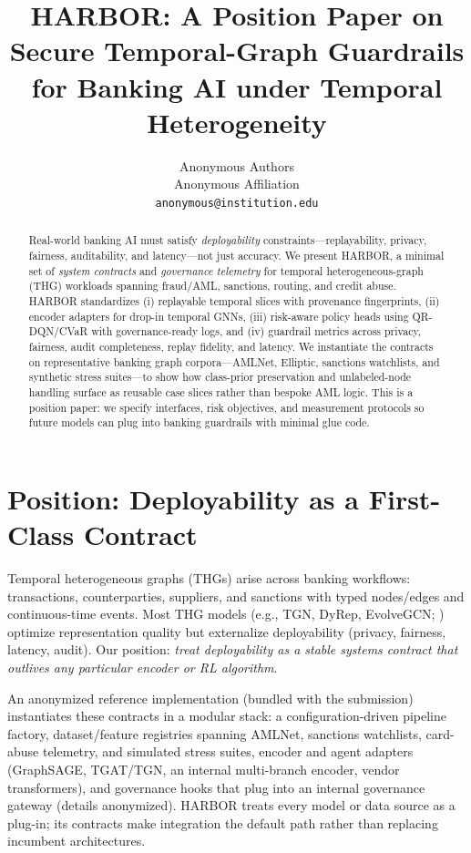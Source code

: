 \documentclass[letterpaper]{article}
\title{HARBOR: A Position Paper on Secure Temporal-Graph Guardrails\\for Banking AI under Temporal Heterogeneity}
\author{
Anonymous Authors\\
Anonymous Affiliation\\
\texttt{anonymous@institution.edu}
}
\begin{document}
\maketitle

\begin{abstract}
Real-world banking AI must satisfy \emph{deployability} constraints---replayability, privacy, fairness, auditability, and latency---not just accuracy. We present \textsc{HARBOR}, a minimal set of \emph{system contracts} and \emph{governance telemetry} for temporal heterogeneous-graph (THG) workloads spanning fraud/AML, sanctions, routing, and credit abuse. \textsc{HARBOR} standardizes (i) replayable temporal slices with provenance fingerprints, (ii) encoder adapters for drop-in temporal GNNs, (iii) risk-aware policy heads using QR-DQN/CVaR with governance-ready logs, and (iv) guardrail metrics across privacy, fairness, audit completeness, replay fidelity, and latency. We instantiate the contracts on representative banking graph corpora---AMLNet, Elliptic, sanctions watchlists, and synthetic stress suites---to show how class-prior preservation and unlabeled-node handling surface as reusable case slices rather than bespoke AML logic. This is a position paper: we specify interfaces, risk objectives, and measurement protocols so future models can plug into banking guardrails with minimal glue code.
\end{abstract}

\section{Position: Deployability as a First-Class Contract}
\label{sec:position}
Temporal heterogeneous graphs (THGs) arise across banking workflows: transactions, counterparties, suppliers, and sanctions with typed nodes/edges and continuous-time events. Most THG models (e.g., TGN, DyRep, EvolveGCN; \citealt{rossi2020tgn,trivedi2019dyrep,pareja2020evolvegcn}) optimize representation quality but externalize deployability (privacy, fairness, latency, audit). Our position: \emph{treat deployability as a stable systems contract that outlives any particular encoder or RL algorithm}. 

An anonymized reference implementation (bundled with the submission) instantiates these contracts in a modular stack: a configuration-driven pipeline factory, dataset/feature registries spanning AMLNet, sanctions watchlists, card-abuse telemetry, and simulated stress suites, encoder and agent adapters (GraphSAGE, TGAT/TGN, an internal multi-branch encoder, vendor transformers), and governance hooks that plug into an internal governance gateway (details anonymized). \textsc{HARBOR} treats every model or data source as a plug-in; its contracts make integration the default path rather than replacing incumbent architectures.
\end{document}

